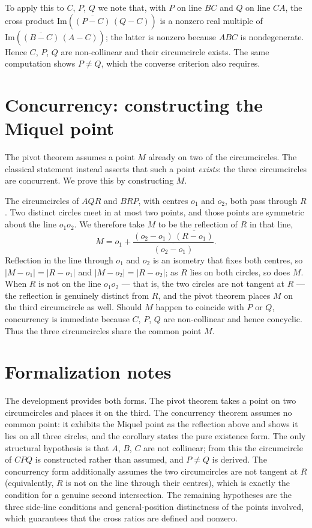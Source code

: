 \documentclass[11pt,a4paper]{article}
\begin{document}
To apply this to \(C\), \(P\), \(Q\) we note that, with \(P\) on line \(BC\)
and \(Q\) on line \(CA\), the cross product \(\mathrm{Im}(\overline{(P-C)}
\,(Q-C))\) is a nonzero real multiple of \(\mathrm{Im}(\overline{(B-C)}
\,(A-C))\); the latter is nonzero because \(ABC\) is nondegenerate.  Hence
\(C\), \(P\), \(Q\) are non-collinear and their circumcircle exists.  The same
computation shows \(P \neq Q\), which the converse criterion also requires.

\section{Concurrency: constructing the Miquel point}

The pivot theorem assumes a point \(M\) already on two of the circumcircles.
The classical statement instead asserts that such a point \emph{exists}: the
three circumcircles are concurrent.  We prove this by constructing \(M\).

The circumcircles of \(AQR\) and \(BRP\), with centres \(o_1\) and \(o_2\),
both pass through \(R\).  Two distinct circles meet in at most two points, and
those points are symmetric about the line \(o_1 o_2\).  We therefore take
\(M\) to be the reflection of \(R\) in that line,
\[
  M = o_1 + \frac{(o_2-o_1)\,\overline{(R-o_1)}}{\overline{(o_2-o_1)}}.
\]
Reflection in the line through \(o_1\) and \(o_2\) is an isometry that fixes
both centres, so \(\lvert M-o_1\rvert = \lvert R-o_1\rvert\) and
\(\lvert M-o_2\rvert = \lvert R-o_2\rvert\); as \(R\) lies on both circles, so
does \(M\).  When \(R\) is not on the line \(o_1 o_2\) --- that is, the two
circles are not tangent at \(R\) --- the reflection is genuinely distinct from
\(R\), and the pivot theorem places \(M\) on the third circumcircle as well.
Should \(M\) happen to coincide with \(P\) or \(Q\), concurrency is immediate
because \(C\), \(P\), \(Q\) are non-collinear and hence concyclic.  Thus the
three circumcircles share the common point \(M\).

\section{Formalization notes}

The development provides both forms.  The pivot theorem
 takes a point on two circumcircles and
places it on the third.  The concurrency theorem
 assumes no common point: it exhibits
the Miquel point as the reflection above and shows it lies on all three
circles, and the corollary 
states the pure existence form.  The only structural hypothesis is that
\(A\), \(B\), \(C\) are not collinear; from this the circumcircle of \(CPQ\) is
constructed rather than assumed, and \(P \neq Q\) is derived.  The concurrency
form additionally assumes the two circumcircles are not tangent at \(R\)
(equivalently, \(R\) is not on the line through their centres), which is
exactly the condition for a genuine second intersection.  The remaining
hypotheses are the three side-line conditions and general-position
distinctness of the points involved, which guarantees that the cross ratios
are defined and nonzero.





\end{document}
